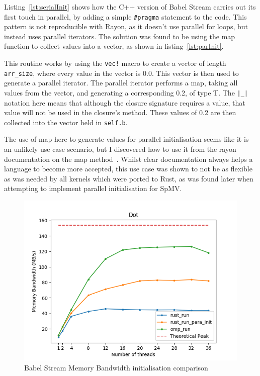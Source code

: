 Listing~\ref{lst:serialInit} shows how the C++ version of Babel Stream carries out its first touch in parallel, by adding a simple \texttt{\#pragma} statement to the code. This pattern is not reproducible with Rayon, as it doesn't use parallel for loops, but instead uses parallel iterators. The solution was found to be using the map function to collect values into a vector, as shown in listing~\ref{lst:parInit}.

This routine works by using the \texttt{vec!} macro to create a vector of length \texttt{arr\_size}, where every value in the vector is 0.0. This vector is then used to generate a parallel iterator. The parallel iterator performs a map, taking all values from the vector, and generating a corresponding 0.2, of type T. The \texttt{|\_|} notation here means that although the closure signature requires a value, that value will not be used in the closure's method.
These values of 0.2 are then collected into the vector held in \texttt{self.b}.

The use of map here to generate values for parallel initialisation seems like it is an unlikely use case scenario, but I discovered how to use it from the rayon documentation on the map method~\cite{rayonMap}. Whilst clear documentation always helps a language to become more accepted, this use case was shown to not be as flexible as was needed by all kernels which were ported to Rust, as was found later when attempting to implement parallel initialisation for SpMV.

\begin{figure}[h]
    \centering
    \includegraphics[width=.8\linewidth]{figs/babel/dot-init.png}
    \caption{Babel Stream Memory Bandwidth initialisation comparison}
    \label{fig:babel-dot-init}
\end{figure}

